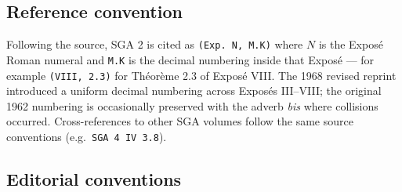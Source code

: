 \documentclass[
]{article}
\begin{document}
\subsection{Reference convention}\label{reference-convention}

Following the source, SGA 2 is cited as \texttt{(Exp.\ N,\ M.K)} where
\(N\) is the Exposé Roman numeral and \texttt{M.K} is the decimal
numbering inside that Exposé --- for example \texttt{(VIII,\ 2.3)} for
Théorème 2.3 of Exposé VIII. The 1968 revised reprint introduced a
uniform decimal numbering across Exposés III--VIII; the original 1962
numbering is occasionally preserved with the adverb \emph{bis} where
collisions occurred. Cross-references to other SGA volumes follow the
same source conventions (e.g.~\texttt{SGA\ 4\ IV\ 3.8}).

\subsection{Editorial conventions}\label{editorial-conventions}
\end{document}
